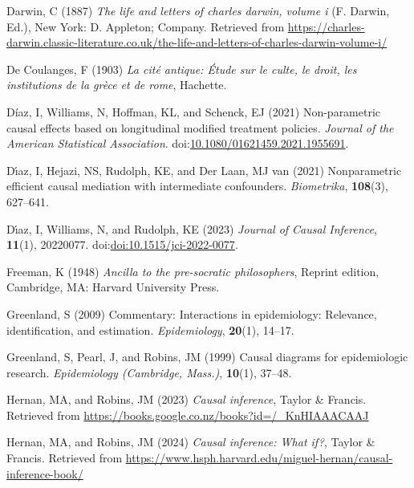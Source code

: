 \documentclass[
  single column]{article}
\newlength{\cslhangindent}
\newenvironment{CSLReferences}[2] %
 {\begin{list}{}{%
  \setlength{\itemindent}{0pt}
  \setlength{\leftmargin}{0pt}
  \setlength{\parsep}{0pt}
  \ifodd #1
   \setlength{\leftmargin}{\cslhangindent}
   \setlength{\itemindent}{-1\cslhangindent}
  \fi
  \setlength{\itemsep}{#2\baselineskip}}}
 {\end{list}}
\begin{document}
\begin{CSLReferences}{1}{0}
Darwin, C (1887) \emph{The life and letters of charles darwin, volume i}
(F. Darwin, Ed.), New York: D. Appleton; Company. Retrieved from
\url{https://charles-darwin.classic-literature.co.uk/the-life-and-letters-of-charles-darwin-volume-i/}

De Coulanges, F (1903) \emph{La cité antique: Étude sur le culte, le
droit, les institutions de la grèce et de rome}, Hachette.

Díaz, I, Williams, N, Hoffman, KL, and Schenck, EJ (2021) Non-parametric
causal effects based on longitudinal modified treatment policies.
\emph{Journal of the American Statistical Association}.
doi:\href{https://doi.org/10.1080/01621459.2021.1955691}{10.1080/01621459.2021.1955691}.

Dı́az, I, Hejazi, NS, Rudolph, KE, and Der Laan, MJ van (2021)
Nonparametric efficient causal mediation with intermediate confounders.
\emph{Biometrika}, \textbf{108}(3), 627--641.

Dı́az, I, Williams, N, and Rudolph, KE (2023) \emph{Journal of Causal
Inference}, \textbf{11}(1), 20220077.
doi:\href{https://doi.org/doi:10.1515/jci-2022-0077}{doi:10.1515/jci-2022-0077}.

Freeman, K (1948) \emph{Ancilla to the pre-socratic philosophers},
Reprint edition, Cambridge, MA: Harvard University Press.

Greenland, S (2009) Commentary: Interactions in epidemiology: Relevance,
identification, and estimation. \emph{Epidemiology}, \textbf{20}(1),
14--17.

Greenland, S, Pearl, J, and Robins, JM (1999) Causal diagrams for
epidemiologic research. \emph{Epidemiology (Cambridge, Mass.)},
\textbf{10}(1), 37--48.

Hernan, MA, and Robins, JM (2023) \emph{Causal inference}, Taylor \&
Francis. Retrieved from
\url{https://books.google.co.nz/books?id=/_KnHIAAACAAJ}

Hernan, MA, and Robins, JM (2024) \emph{Causal inference: What if?},
Taylor \& Francis. Retrieved from
\url{https://www.hsph.harvard.edu/miguel-hernan/causal-inference-book/}


\end{CSLReferences}
\end{document}
